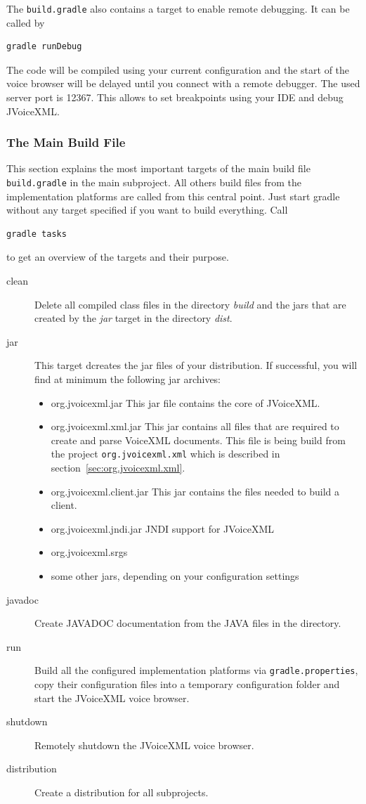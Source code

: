 \documentclass[11pt,a4paper]{article}
\begin{document}
The \texttt{build.gradle} also contains a target to enable remote
debugging. It can be called by
\begin{lstlisting}
gradle runDebug
\end{lstlisting}
The code will be compiled using your current configuration and the start of the
voice browser will be delayed until you connect with a remote debugger. The
used server port is 12367. This allows to set breakpoints using your IDE and
debug JVoiceXML.

\subsubsection{The Main Build File}
\label{sec:main-build-file}

This section explains the most important targets of the main build file
\texttt{build.gradle} in the main subproject. All others build files from the
implementation platforms
are called from this central point. Just start gradle without any target specified
if you want to build everything. Call
\begin{lstlisting}
gradle tasks
\end{lstlisting}
to get an overview of the targets and their purpose.

\begin{description}
\item[clean]
Delete all compiled class files in the directory \emph{build}
and the jars that are created by the \emph{jar} target in the directory 
\emph{dist}.

\item[jar]
This target dcreates the jar files of your distribution.
If successful, you will find at minimum the following jar archives:
\begin{itemize}
\item org.jvoicexml.jar This jar file contains the core of JVoiceXML.
\item org.jvoicexml.xml.jar This jar contains all files that are required
to create and parse VoiceXML documents. This file is being build from the
project \texttt{org.jvoicexml.xml} which is described in
section~\ref{sec:org.jvoicexml.xml}.
\item org.jvoicexml.client.jar This jar contains the files needed to build
a client.
\item org.jvoicexml.jndi.jar JNDI support for JVoiceXML
\item org.jvoicexml.srgs
\item some other jars, depending on your configuration settings
\end{itemize}

\item[javadoc]
Create JAVADOC documentation from the JAVA files in the directory.
\item[run] Build all the configured implementation platforms
via \texttt{gradle.properties}, copy their configuration files into a
temporary configuration folder and start the JVoiceXML voice browser.
\item[shutdown] Remotely shutdown the JVoiceXML voice browser.
\item[distribution] Create a distribution for all subprojects.
\end{description}
\end{document}
